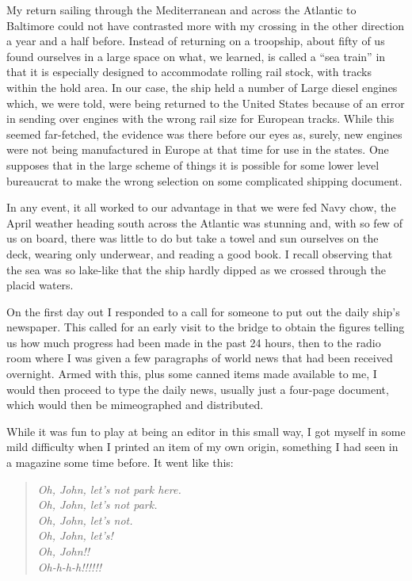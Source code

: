 \documentclass[../m3y]{subfiles}
\begin{document}
My return sailing through the Mediterranean and across the Atlantic to Baltimore could not have contrasted more with my crossing in the other direction a year and a half before. Instead of returning on a troopship, about fifty of us found ourselves in a large space on what, we learned, is called a ``sea train'' in that it is especially designed to accommodate rolling rail stock, with tracks within the hold area. In our case, the ship held a number of Large diesel engines which, we were told, were being returned to the United States because of an error in sending over engines with the wrong rail size for European tracks. While this seemed far-fetched, the evidence was there before our eyes as, surely, new engines were not being manufactured in Europe at that time for use in the states. One supposes that in the large scheme of things it is possible for some lower level bureaucrat to make the wrong selection on some complicated shipping document.

In any event, it all worked to our advantage in that we were fed Navy chow, the April weather heading south across the Atlantic was stunning and, with so few of us on board, there was little to do but take a towel and sun ourselves on the deck, wearing only underwear, and reading a good book. I recall observing that the sea was so lake-like that the ship hardly dipped as we crossed through the placid waters.

On the first day out I responded to a call for someone to put out the daily ship's newspaper. This called for an early visit to the bridge to obtain the figures telling us how much progress had been made in the past 24 hours, then to the radio room where I was given a few paragraphs of world news that had been received overnight. Armed with this, plus some canned items made available to me, I would then proceed to type the daily news, usually just a four-page document, which would then be mimeographed and distributed.

While it was fun to play at being an editor in this small way, I got myself in some mild difficulty when I printed an item of my own origin, something I had seen in a magazine some time before. It went like this:

\begin{quote}
\emph{Oh, John, let's not park here.\\
Oh, John, let's not park.\\
Oh, John, let's not.\\
Oh, John, let's!\\
Oh, John!!\\
Oh-h-h-h!!!!!!
}
\end{quote}
\end{document}
